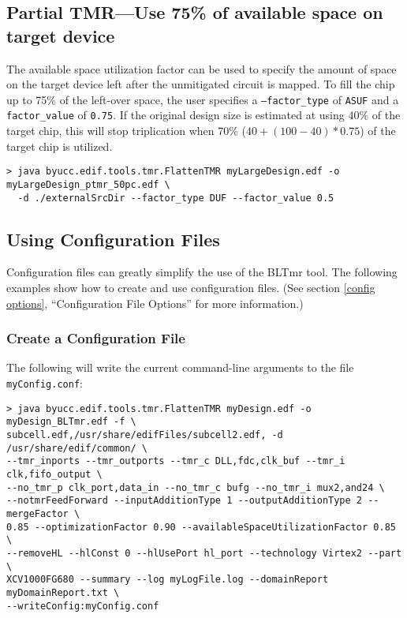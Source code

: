 \documentclass[english]{article}
\begin{document}
\subsection{Partial TMR---Use 75\% of available space on target device}
The available space utilization factor can be used to specify the amount of
space on the target device left after the unmitigated circuit is mapped. To
fill the chip up to 75\% of the left-over space, the user specifies a 
\texttt{--factor\_type} of \texttt{ASUF} and a \texttt{factor\_value} of 
\texttt{0.75}. If the original design size is estimated at using 40\% of the
target chip, this will stop triplication when 70\% ($40 + (100-40)*0.75$) of
the target chip is utilized.

\begin{verbatim}
> java byucc.edif.tools.tmr.FlattenTMR myLargeDesign.edf -o myLargeDesign_ptmr_50pc.edf \
  -d ./externalSrcDir --factor_type DUF --factor_value 0.5
\end{verbatim}


\subsection{Using Configuration Files}
\label{using config}
Configuration files can greatly simplify the use of the BLTmr tool. The following 
examples show how to create and use configuration files. (See section
\ref{config options}, ``Configuration File Options'' for more information.)

\subsubsection{Create a Configuration File}
The following will write the current command-line arguments to the file
\texttt{myConfig.conf}:

\begin{verbatim}
> java byucc.edif.tools.tmr.FlattenTMR myDesign.edf -o myDesign_BLTmr.edf -f \ 
subcell.edf,/usr/share/edifFiles/subcell2.edf, -d /usr/share/edif/common/ \ 
--tmr_inports --tmr_outports --tmr_c DLL,fdc,clk_buf --tmr_i clk,fifo_output \ 
--no_tmr_p clk_port,data_in --no_tmr_c bufg --no_tmr_i mux2,and24 \ 
--notmrFeedForward --inputAdditionType 1 --outputAdditionType 2 --mergeFactor \ 
0.85 --optimizationFactor 0.90 --availableSpaceUtilizationFactor 0.85 \
--removeHL --hlConst 0 --hlUsePort hl_port --technology Virtex2 --part \
XCV1000FG680 --summary --log myLogFile.log --domainReport myDomainReport.txt \
--writeConfig:myConfig.conf
\end{verbatim}
\end{document}
